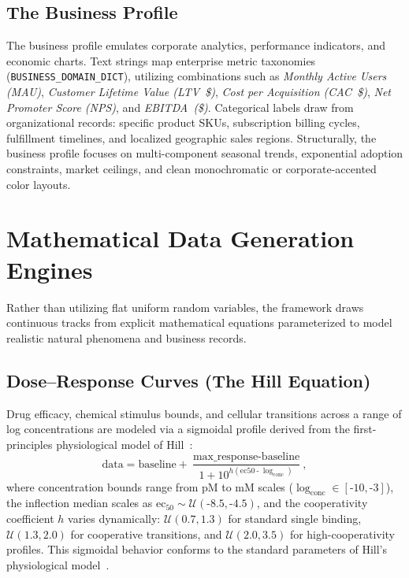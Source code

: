 \documentclass[11pt,twocolumn]{article}
\begin{document}
\subsection{The Business Profile}\label{sec:business}

The business profile emulates corporate analytics, performance indicators, and economic charts.
Text strings map enterprise metric taxonomies (\texttt{BUSINESS\_DOMAIN\_DICT}), utilizing combinations such as \emph{Monthly Active Users (MAU)}, \emph{Customer Lifetime Value (LTV~\$)}, \emph{Cost per Acquisition (CAC~\$)}, \emph{Net Promoter Score (NPS)}, and \emph{EBITDA~(\$)}.
Categorical labels draw from organizational records: specific product SKUs, subscription billing cycles, fulfillment timelines, and localized geographic sales regions.
Structurally, the business profile focuses on multi-component seasonal trends, exponential adoption constraints, market ceilings, and clean monochromatic or corporate-accented color layouts.

\section{Mathematical Data Generation Engines}\label{sec:math}

Rather than utilizing flat uniform random variables, the framework draws continuous tracks from explicit mathematical equations parameterized to model realistic natural phenomena and business records.

\subsection{Dose--Response Curves (The Hill Equation)}\label{sec:hill}

Drug efficacy, chemical stimulus bounds, and cellular transitions across a range of log concentrations are modeled via a sigmoidal profile derived from the first-principles physiological model of Hill~\cite{hill1910dissociation}:
\begin{equation}\label{eq:hill}
  \text{data} = \text{baseline} + \frac{\text{max\_response} \mathbin{\text{-}} \text{baseline}}{1 + 10^{h(\text{ec50} \mathbin{\text{-}} \log_{\text{conc}})}},
\end{equation}
where concentration bounds range from pM to mM scales ($\log_{\text{conc}} \in [\text{-}10, \text{-}3]$), the inflection median scales as $\text{ec}_{50} \sim \mathcal{U}(\text{-}8.5, \text{-}4.5)$, and the cooperativity coefficient $h$ varies dynamically: $\mathcal{U}(0.7, 1.3)$ for standard single binding, $\mathcal{U}(1.3, 2.0)$ for cooperative transitions, and $\mathcal{U}(2.0, 3.5)$ for high-cooperativity profiles. This sigmoidal behavior conforms to the standard parameters of Hill's physiological model~\cite{hill1910dissociation}.
\end{document}
